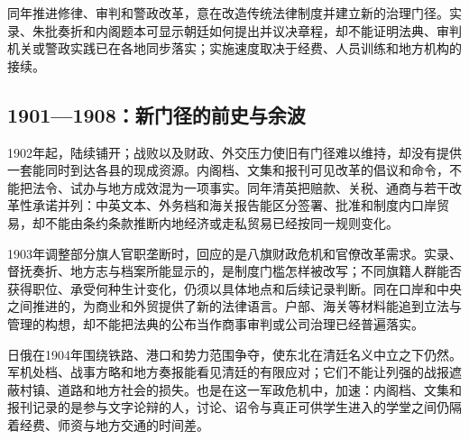 同年推进修律、审判和警政改革，意在改造传统法律制度并建立新的治理门径。实录、朱批奏折和内阁题本可显示朝廷如何提出并议决章程，却不能证明法典、审判机关或警政实践已在各地同步落实；实施速度取决于经费、人员训练和地方机构的接续。

\subsection{1901—1908：新门径的前史与余波}


























1902年起，陆续铺开；战败以及财政、外交压力使旧有门径难以维持，却没有提供一套能同时到达各县的现成资源。内阁档、文集和报刊可见改革的倡议和命令，不能把法令、试办与地方成效混为一项事实。同年清英把赔款、关税、通商与若干改革性承诺并列：中英文本、外务档和海关报告能区分签署、批准和制度内口岸贸易，却不能由条约条款推断内地经济或走私贸易已经按同一规则变化。

1903年调整部分旗人官职垄断时，回应的是八旗财政危机和官僚改革需求。实录、督抚奏折、地方志与档案所能显示的，是制度门槛怎样被改写；不同旗籍人群能否获得职位、承受何种生计变化，仍须以具体地点和后续记录判断。同在口岸和中央之间推进的，为商业和外贸提供了新的法律语言。户部、海关等材料能追到立法与管理的构想，却不能把法典的公布当作商事审判或公司治理已经普遍落实。



日俄在1904年围绕铁路、港口和势力范围争夺，使东北在清廷名义中立之下仍然。军机处档、战事方略和地方奏报能看见清廷的有限应对；它们不能让列强的战报遮蔽村镇、道路和地方社会的损失。也是在这一军政危机中，加速：内阁档、文集和报刊记录的是参与文字论辩的人，讨论、诏令与真正可供学生进入的学堂之间仍隔着经费、师资与地方交通的时间差。






